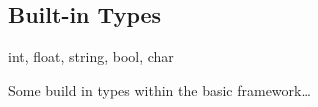 

\subsection{Built-in Types}


int, float, string, bool, char


Some build in types within the basic framework\ldots

